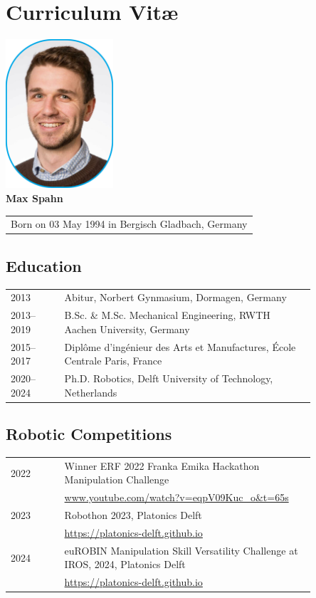 \chapter*{Curriculum Vit\ae}
\begin{center}
    \includegraphics[width=0.3\textwidth]{src/helpers/cv/max_spahn.png}\\
    \vspace{0.5cm}
    {\Large\textbf{Max Spahn}} \\
    \vspace{0.2cm}
    \begin{tabular}{c}
        Born on 03 May 1994 in Bergisch Gladbach, Germany
    \end{tabular}
\end{center}

\section*{Education}

\begin{tabular}{p{0.15\linewidth} p{0.7\linewidth}}
  2013 & Abitur, Norbert Gynmasium, Dormagen, Germany\\
    2013--2019 & B.Sc. \& M.Sc. Mechanical Engineering, RWTH Aachen University, Germany\\
    2015--2017 & Diplôme d'ingénieur des Arts et Manufactures, École Centrale Paris, France\\
    2020--2024 & Ph.D. Robotics, Delft University of Technology, Netherlands \\
\end{tabular}

\section*{Robotic Competitions}
\begin{tabular}{p{0.15\linewidth} p{0.7\linewidth}}
  2022 & Winner ERF 2022 Franka Emika Hackathon Manipulation
  Challenge\\
  & \url{www.youtube.com/watch?v=eqpV09Kuc_o&t=65s} \\
  2023 & Robothon 2023, Platonics Delft \\
  & \url{https://platonics-delft.github.io} \\
  2024 & euROBIN Manipulation Skill Versatility Challenge at
  IROS, 2024, Platonics Delft \\
  & \url{https://platonics-delft.github.io} \\
\end{tabular}
